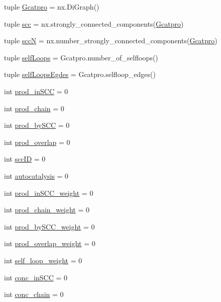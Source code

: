 \begin{DoxyCompactItemize}
tuple \hyperlink{a00096_ad88c3dd8eb89ddbe8720462b03f35003}{Gcatpro} = nx.\-Di\-Graph()
\item 
tuple \hyperlink{a00096_a2094b7f0917a16a948a2d1c4d700e84c}{scc} = nx.\-strongly\-\_\-connected\-\_\-components(\hyperlink{a00096_ad88c3dd8eb89ddbe8720462b03f35003}{Gcatpro})
\item 
tuple \hyperlink{a00096_a185cbf8ef1ec67f52695562582418793}{scc\-N} = nx.\-number\-\_\-strongly\-\_\-connected\-\_\-components(\hyperlink{a00096_ad88c3dd8eb89ddbe8720462b03f35003}{Gcatpro})
\item 
tuple \hyperlink{a00096_a8fec45ae9b70981ce94eaeed14d888b1}{self\-Loops} = Gcatpro.\-number\-\_\-of\-\_\-selfloops()
\item 
tuple \hyperlink{a00096_ad34596e89eef2cfb696f61a810765c7a}{self\-Loops\-Egdes} = Gcatpro.\-selfloop\-\_\-edges()
\item 
int \hyperlink{a00096_adbc76b0558ceb74d798b35146a583474}{prod\-\_\-in\-S\-C\-C} = 0
\item 
int \hyperlink{a00096_ab307c6047e4d16ec0335266b24e7db5a}{prod\-\_\-chain} = 0
\item 
int \hyperlink{a00096_abb2ac92624837ae48b882d145c5aab11}{prod\-\_\-by\-S\-C\-C} = 0
\item 
int \hyperlink{a00096_a213e964195f0666d00663ca874a09caa}{prod\-\_\-overlap} = 0
\item 
int \hyperlink{a00096_a1dd3c43841ba4485a66889600f099a0c}{scc\-I\-D} = 0
\item 
int \hyperlink{a00096_a70ccd5d519e878c6c8a7d0aa73caf46c}{autocatalysis} = 0
\item 
int \hyperlink{a00096_aa22adccedd9ae548d0687df507ebd92d}{prod\-\_\-in\-S\-C\-C\-\_\-weight} = 0
\item 
int \hyperlink{a00096_a6736365f1f19058f6e1d57287383dbcc}{prod\-\_\-chain\-\_\-weight} = 0
\item 
int \hyperlink{a00096_a5f45dbe461b3b18021c93780e87cc40e}{prod\-\_\-by\-S\-C\-C\-\_\-weight} = 0
\item 
int \hyperlink{a00096_ab78b07d6cd1a94356c4fee43dfc1272a}{prod\-\_\-overlap\-\_\-weight} = 0
\item 
int \hyperlink{a00096_ae9790fbc87f233c94224436a9cbd59c1}{self\-\_\-loop\-\_\-weight} = 0
\item 
int \hyperlink{a00096_a3fcb8f9c7e88b5c53f1201a383b38666}{conc\-\_\-in\-S\-C\-C} = 0
\item 
int \hyperlink{a00096_a3188cc39362e42ecb36d23a98f2b5a78}{conc\-\_\-chain} = 0
\item 

\end{DoxyCompactItemize}

